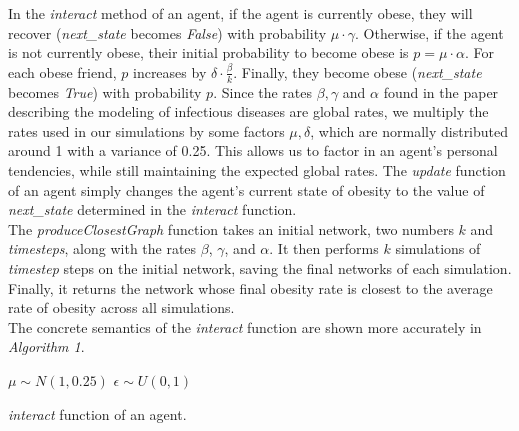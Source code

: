\documentclass[11pt]{article}
\begin{document}
In the \textit{interact} method of an agent, if the agent is currently obese, they will recover (\textit{next\_state} becomes \textit{False}) with probability \(\mu \cdot \gamma\). 
Otherwise, if the agent is not currently obese, their initial probability to become obese is \(p = \mu \cdot \alpha\). 
For each obese friend, \(p\) increases by \(\delta \cdot \frac{\beta}{k}\). Finally, they become obese (\textit{next\_state} becomes \textit{True}) with probability \(p\). Since the rates \(\beta, \gamma\) and \(\alpha\) found in the paper describing the modeling of infectious diseases\cite{infectiousDiseaseModeling} are global rates, we multiply the rates used in our simulations by some factors \(\mu, \delta\), which are normally distributed around 1 with a variance of 0.25. This allows us to factor in an agent's personal tendencies, while still maintaining the expected global rates. The \textit{update} function of an agent simply changes the agent's current state of obesity to the value of \textit{next\_state} determined in the \textit{interact} function. \\

The \textit{produceClosestGraph} function takes an initial network, two numbers \(k\) and \textit{timesteps}, along with the rates \(\beta\), \(\gamma\), and \(\alpha\). It then performs \(k\) simulations of \textit{timestep} steps on the initial network, saving the final networks of each simulation. Finally, it returns the network whose final obesity rate is closest to the average rate of obesity across all simulations. \\

The concrete semantics of the \textit{interact} function are shown more accurately in \textit{Algorithm 1}.

\begin{algorithm}[H]
    \(\mu \sim N(1, 0.25)\)\;
    \(\epsilon \sim U(0, 1)\)\;
    \caption{{\textit{interact} function of an agent. \label{Algorithm}}}
\end{algorithm}
\end{document}
